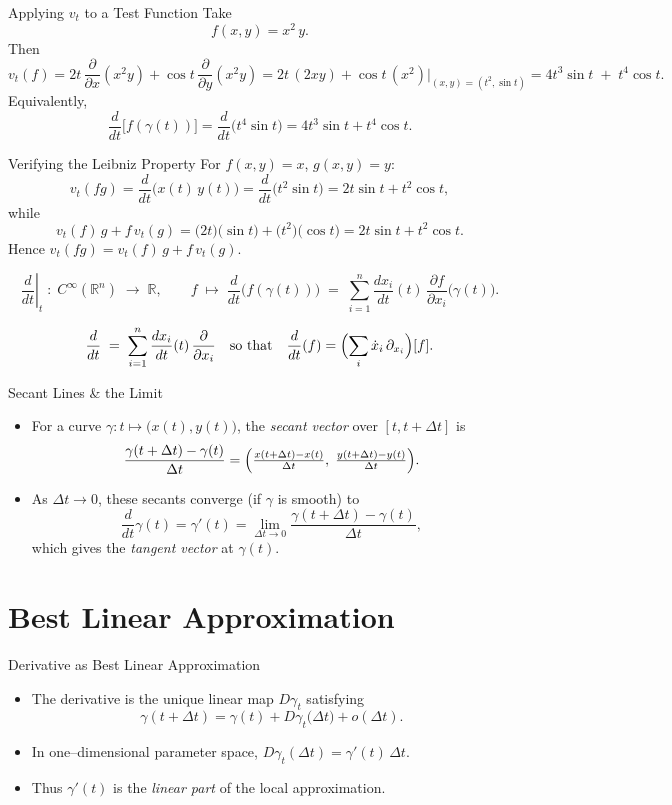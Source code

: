 \documentclass[11pt,openany]{article}
\begin{document}
\begin{frame}{Applying \(v_t\) to a Test Function}
	Take
	\[
	f(x,y) = x^2\,y.
	\]
	Then
	\[
	v_t(f)
	= 2t\,\frac{\partial}{\partial x}(x^2y)
	+ \cos t\,\frac{\partial}{\partial y}(x^2y)
	= 2t\,(2xy) + \cos t\,(x^2)
	\bigg|_{(x,y)=(t^2,\sin t)}
	= 4t^3\sin t \;+\; t^4\cos t.
	\]
	Equivalently,
	\[
	\frac{d}{dt}\bigl[f(\gamma(t))\bigr]
	= \frac{d}{dt}\bigl(t^4\sin t\bigr)
	= 4t^3\sin t + t^4\cos t.
	\]
\end{frame}

\begin{frame}{Verifying the Leibniz Property}
	For \(f(x,y)=x\), \(g(x,y)=y\):
	\[
	v_t(fg)
	= \frac{d}{dt}\bigl(x(t)\,y(t)\bigr)
	= \frac{d}{dt}\bigl(t^2\sin t\bigr)
	= 2t\sin t + t^2\cos t,
	\]
	while
	\[
	v_t(f)\,g + f\,v_t(g)
	= \bigl(2t\bigr)\bigl(\sin t\bigr)
	+ \bigl(t^2\bigr)\bigl(\cos t\bigr)
	= 2t\sin t + t^2\cos t.
	\]
	Hence \(v_t(fg)=v_t(f)\,g+f\,v_t(g)\).
\end{frame}
\[
\left.\frac{d}{dt}\right|_{t}\;:\;C^\infty(\mathbb{R}^n)\;\longrightarrow\;\mathbb{R},
\qquad
f\;\longmapsto\;
\frac{d}{dt}\bigl(f(\gamma(t))\bigr)
\;=\;
\sum_{i=1}^n \frac{dx_i}{dt}(t)\,\frac{\partial f}{\partial x_i}\bigl(\gamma(t)\bigr).
\]

\[
\frac{d}{dt}
\;=\;
\sum_{i=1}^n \frac{dx_i}{dt}(t)\,\frac{\partial}{\partial x_i}
\quad\text{so that}\quad
\frac{d}{dt}(f)
=\Bigl(\sum_i \dot x_i\,\partial_{x_i}\Bigr)[f].
\]

\begin{frame}{Secant Lines \& the Limit}
	\begin{itemize}
		\item For a curve $\gamma\colon t\mapsto\bigl(x(t),y(t)\bigr)$, the \emph{secant vector} over $[t,t+\Delta t]$ is
		\[
		\frac{\gamma(t+\Delta t)-\gamma(t)}{\Delta t}
		= \Bigl(\tfrac{x(t+\Delta t)-x(t)}{\Delta t},\;\tfrac{y(t+\Delta t)-y(t)}{\Delta t}\Bigr).
		\]
		\item As $\Delta t \to 0$, these secants converge (if $\gamma$ is smooth) to
		\[
		\frac{d}{dt}\gamma(t)=\gamma'(t)
		= \lim_{\Delta t\to0}
		\frac{\gamma(t+\Delta t)-\gamma(t)}{\Delta t},
		\]
		which gives the \emph{tangent vector} at $\gamma(t)$.
	\end{itemize}
\end{frame}

\section{Best Linear Approximation}
\begin{frame}{Derivative as Best Linear Approximation}
	\begin{itemize}
		\item The derivative is the unique linear map $D\gamma_t$ satisfying
		\[
		\gamma(t+\Delta t)
		= \gamma(t)
		+ D\gamma_t\bigl(\Delta t\bigr)
		+ o(\Delta t).
		\]
		\item In one–dimensional parameter space, $D\gamma_t(\Delta t)=\gamma'(t)\,\Delta t$.
		\item Thus $\gamma'(t)$ is the \emph{linear part} of the local approximation.
	\end{itemize}
\end{frame}
\end{document}
